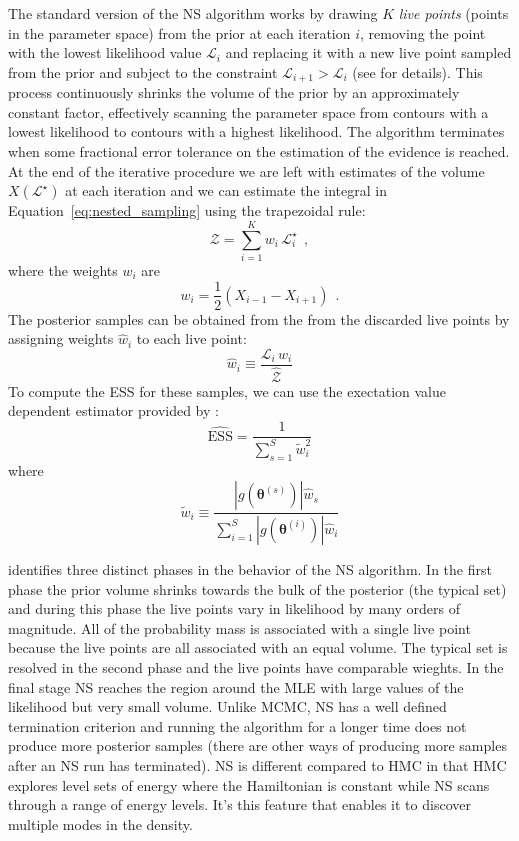 \documentclass[12pt,dvipsnames]{report}
\renewcommand{\vec}[1]{\boldsymbol{\mathbf{#1}}}
\newcommand{\hquad}{~~}
\begin{document}
The standard version of the NS algorithm works by drawing $K$ \textsl{live points} 
(points in the parameter space) from the prior at each iteration $i$, removing 
the point with the lowest likelihood value $\mathcal{L}_i$ and replacing it 
with a new live point sampled from the prior and subject to the 
constraint $\mathcal{L}_{i+1}>\mathcal{L}_i$ (see \citet{arXiv:2205.15570} 
for details). This process continuously shrinks the volume of the prior by an 
approximately constant factor, effectively scanning the parameter space from 
contours with a lowest likelihood to contours with a highest likelihood.
The algorithm terminates when some fractional error tolerance on the estimation 
of the evidence is reached. 
At the end of the iterative procedure we are left with 
estimates of the volume $X(\mathcal{L}^\star)$ at each iteration and we can 
estimate the integral in Equation~\ref{eq:nested_sampling} using the trapezoidal 
rule:
\begin{equation}
\mathcal{Z}=\sum_{i=1}^{K}w_i\,\mathcal{L}_i^\star\hquad ,
\end{equation}
where the weights $w_i$ are 
\begin{equation}
w_{i}=\frac{1}{2}\left(X_{i-1}-X_{i+1}\right)\hquad .
\end{equation}
The posterior samples can be obtained from the from the discarded live points 
by assigning weights $\hat{w}_i$ to each live point:
\begin{equation}
    \hat{w}_i\equiv \frac{\mathcal{L}_i\,w_i}{\hat{\mathcal{Z}}}
\end{equation}
To compute the ESS for these samples, we can use the exectation value dependent 
estimator provided by \citet{arXiv:1809.04129}:
\begin{equation}
    \widehat{\mathrm{ESS}}=\frac{1}{\sum_{s=1}^S\tilde{w}_i^2}
\end{equation}
where
\begin{equation}
\tilde{w}_{i}\equiv\frac{\left|g\left(\vec{\theta}^{(s)}\right)\right| \hat w_{s}}{\sum_{i=1}^{S}\left|g\left(\vec{\theta}^{(i)}\right)\right| \hat w_{i}}
\end{equation}


\cite{arXiv:2101.09675} identifies three distinct phases in the behavior 
of the NS algorithm. In the first phase the prior volume shrinks towards the 
bulk of the posterior (the typical set) and during this phase the live points 
vary in likelihood by many orders of magnitude. All of the probability mass is 
associated with a single live point because the live points are all associated 
with an equal volume. 
The typical set is resolved in the second phase and the live points have 
comparable wieghts.  In the final stage NS reaches the region around the MLE 
with large values of the likelihood but very small volume.
Unlike MCMC, NS has a well defined termination criterion and running the algorithm 
for a longer time does not produce more posterior samples (there are other ways 
of producing more samples after an NS run has terminated).
NS is different compared to HMC in that HMC explores level sets of energy where 
the Hamiltonian is constant while NS scans through a range of energy levels. 
It's this feature that enables it to discover multiple modes in the density.
\end{document}
